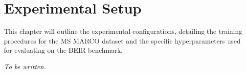 \chapter{Experimental Setup}
\label{ch:experiments}

This chapter will outline the experimental configurations, detailing the training procedures for the MS MARCO dataset and the specific hyperparameters used for evaluating on the BEIR benchmark.

\textit{To be written.}
